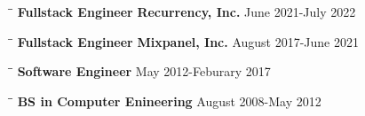 \documentclass{res}
\begin{document}
\begin{resume}
    \vspace{-20pt}\begin{tabbing}
    \hspace{2.2in}\= \hspace{2.2in}\= \kill
    {\bf Fullstack Engineer} \> {\bf Recurrency, Inc.}     \>June 2021-July 2022
    \end{tabbing}\vspace{-5pt}
  
    \vspace{-20pt}\begin{tabbing}
    \hspace{2.2in}\= \hspace{2.2in}\= \kill
    {\bf Fullstack Engineer} \> {\bf Mixpanel, Inc.}     \>August 2017-June 2021
    \end{tabbing}\vspace{-5pt}
  
    \vspace{-20pt}\begin{tabbing}
    \hspace{2.2in}\= \hspace{2.2in}\= \kill
    {\bf Software Engineer}  \> May 2012-Feburary 2017
    \end{tabbing}\vspace{-5pt}
  
    \vspace{-20pt}\begin{tabbing}
    \hspace{2.2in}\= \hspace{2.2in}\= \kill
    {\bf BS in Computer Enineering}  \> August 2008-May 2012\\
    \end{tabbing}\vspace{-5pt}
  
  

\end{resume}
\end{document}
